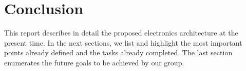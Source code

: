 



\chapter{Conclusion}
This report describes in detail the proposed electronics architecture at the present time. In the next sections, we list and highlight the most important points already defined and the tasks already completed. The last section enumerates the future goals to be achieved by our group.



